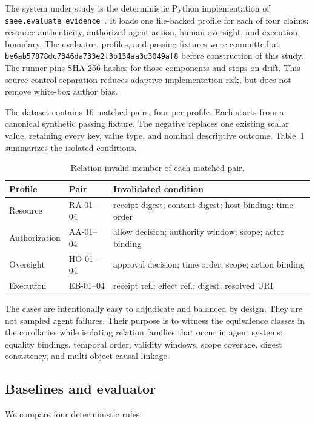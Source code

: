 \documentclass[preprint,12pt]{elsarticle}
\newcommand{\code}[1]{\texttt{#1}}
\begin{document}
The system under study is the deterministic Python implementation of \code{saee.evaluate\_evidence}~\cite{saee2026artifact}. It loads one file-backed profile for each of four claims: resource authenticity, authorized agent action, human oversight, and execution boundary. The evaluator, profiles, and passing fixtures were committed at \code{be6ab57878dc7346da733e2f3b134aa3d3049af8} before construction of this study. The runner pins SHA-256 hashes for those components and stops on drift. This source-control separation reduces adaptive implementation risk, but does not remove white-box author bias.

The dataset contains 16 matched pairs, four per profile. Each starts from a canonical synthetic passing fixture. The negative replaces one existing scalar value, retaining every key, value type, and nominal descriptive outcome. Table~\ref{tab:pairs} summarizes the isolated conditions.

\begin{table}[t]
\centering
\caption{Relation-invalid member of each matched pair.}
\label{tab:pairs}
\small
\begin{tabularx}{\textwidth}{@{}llX@{}}
\toprule
Profile & Pair & Invalidated condition \\
\midrule
Resource & RA-01--04 & receipt digest; content digest; host binding; time order \\
Authorization & AA-01--04 & allow decision; authority window; scope; actor binding \\
Oversight & HO-01--04 & approval decision; time order; scope; action binding \\
Execution & EB-01--04 & receipt ref.; effect ref.; digest; resolved URI \\
\bottomrule
\end{tabularx}
\end{table}

The cases are intentionally easy to adjudicate and balanced by design. They are not sampled agent failures. Their purpose is to witness the equivalence classes in the corollaries while isolating relation families that occur in agent systems: equality bindings, temporal order, validity windows, scope coverage, digest consistency, and multi-object causal linkage.

\subsection{Baselines and evaluator}

We compare four deterministic rules:
\end{document}
